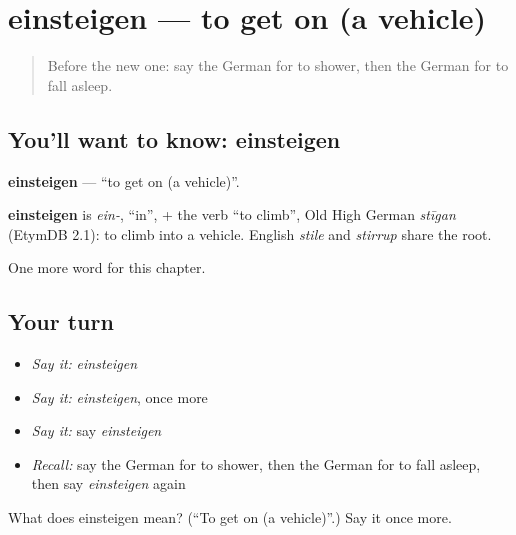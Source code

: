 \section[einsteigen]{einsteigen — to get on (a vehicle)}

\label{lesson:GE-C178-einsteigen}



\begin{quote}
Before the new one: say the German for to shower, then the German for to fall asleep.
\end{quote}

\subsection*{You'll want to know: einsteigen}
\textbf{einsteigen} — \textquotedblleft{}to get on (a vehicle)\textquotedblright{}.

\begin{cousinweb}
\textbf{einsteigen} is \emph{ein-}, \textquotedblleft{}in\textquotedblright{}, + the verb \textquotedblleft{}to climb\textquotedblright{}, Old High German \emph{stīgan} (EtymDB 2.1): to climb into a vehicle. English \emph{stile} and \emph{stirrup} share the root.
\end{cousinweb}

\begin{grammarlens}[title={What you've built}]
One more word for this chapter.
\end{grammarlens}

\subsection*{Your turn}
\begin{itemize}
\raggedright
  \item \emph{Say it:} \emph{einsteigen}
  \item \emph{Say it:} \emph{einsteigen}, once more
  \item \emph{Say it:} say \emph{einsteigen}
  \item \emph{Recall:} say the German for to shower, then the German for to fall asleep, then say \emph{einsteigen} again
\end{itemize}

\begin{tcolorbox}[breakable,colback=teal!4,colframe=teal!35!black,title={Before you move on}]
What does einsteigen mean? (\textquotedblleft{}To get on (a vehicle)\textquotedblright{}.) Say it once more.
\end{tcolorbox}
